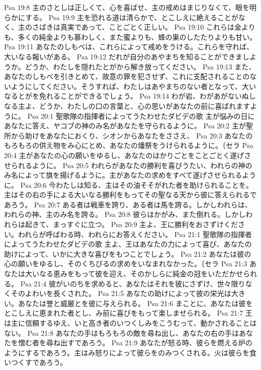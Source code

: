 Psa 19:8  主のさとしは正しくて、心を喜ばせ、主の戒めはまじりなくて、眼を明らかにする。
Psa 19:9  主を恐れる道は清らかで、とこしえに絶えることがなく、主のさばきは真実であって、ことごとく正しい。
Psa 19:10  これらは金よりも、多くの純金よりも慕わしく、また蜜よりも、蜂の巣のしたたりよりも甘い。
Psa 19:11  あなたのしもべは、これらによって戒めをうける。これらを守れば、大いなる報いがある。
Psa 19:12  だれが自分のあやまちを知ることができましようか。どうか、わたしを隠れたとがから解き放ってください。
Psa 19:13  また、あなたのしもべを引きとめて、故意の罪を犯させず、これに支配されることのないようにしてください。そうすれば、わたしはあやまちのない者となって、大いなるとがを免れることができるでしょう。
Psa 19:14  わが岩、わがあがないぬしなる主よ、どうか、わたしの口の言葉と、心の思いがあなたの前に喜ばれますように。
Psa 20:1  聖歌隊の指揮者によってうたわせたダビデの歌 主が悩みの日にあなたに答え、ヤコブの神のみ名があなたを守られるように。
Psa 20:2  主が聖所から助けをあなたにおくり、シオンからあなたをささえ、
Psa 20:3  あなたのもろもろの供え物をみ心にとめ、あなたの燔祭をうけられるように。〔セラ
Psa 20:4  主があなたの心の願いをゆるし、あなたのはかりごとをことごとく遂げさせられるように。
Psa 20:5  われらがあなたの勝利を喜びうたい、われらの神のみ名によって旗を揚げるように。主があなたの求めをすべて遂げさせられるように。
Psa 20:6  今わたしは知る、主はその油そそがれた者を助けられることを。主はその右の手による大いなる勝利をもってその聖なる天から彼に答えられるであろう。
Psa 20:7  ある者は戦車を誇り、ある者は馬を誇る。しかしわれらは、われらの神、主のみ名を誇る。
Psa 20:8  彼らはかがみ、また倒れる。しかしわれらは起きて、まっすぐに立つ。
Psa 20:9  主よ、王に勝利をおさずけください。われらが呼ばわる時、われらにお答えください。
Psa 21:1  聖歌隊の指揮者によってうたわせたダビデの歌 主よ、王はあなたの力によって喜び、あなたの助けによって、いかに大きな喜びをもつことでしょう。
Psa 21:2  あなたは彼の心の願いをゆるし、そのくちびるの求めをいなまれなかった。〔セラ
Psa 21:3  あなたは大いなる恵みをもって彼を迎え、そのかしらに純金の冠をいただかせられる。
Psa 21:4  彼がいのちを求めると、あなたはそれを彼にさずけ、世々限りなくそのよわいを長くされた。
Psa 21:5  あなたの助けによって彼の栄光は大きい。あなたは誉と威厳とを彼に与えられる。
Psa 21:6  まことに、あなたは彼をとこしえに恵まれた者とし、み前に喜びをもって楽しませられる。
Psa 21:7  王は主に信頼するゆえ、いと高き者のいつくしみをこうむって、動かされることはない。
Psa 21:8  あなたの手はもろもろの敵を尋ね出し、あなたの右の手はあなたを憎む者を尋ね出すであろう。
Psa 21:9  あなたが怒る時、彼らを燃える炉のようにするであろう。主はみ怒りによって彼らをのみつくされる。火は彼らを食いつくすであろう。
